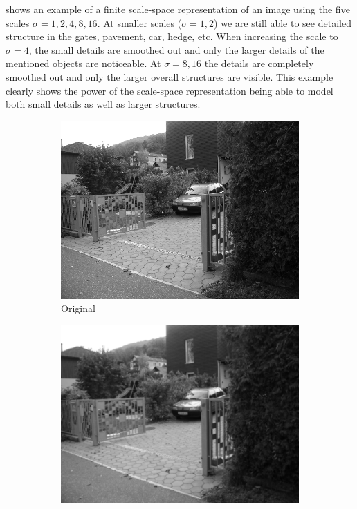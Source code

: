\documentclass[thesis.tex]{subfiles}
\begin{document}
 shows an example of a finite scale-space representation of an image using the five scales $\sigma = 1,2,4,8,16$. At smaller scales ($\sigma = 1,2$) we are still able to see detailed structure in the gates, pavement, car, hedge, etc. When increasing the scale to $\sigma = 4$, the small details are smoothed out and only the larger details of the mentioned objects are noticeable. At $\sigma = 8, 16$ the details are completely smoothed out and only the larger overall structures are visible. This example clearly shows the power of the scale-space representation being able to model both small details as well as larger structures.
%
\begin{figure}[p]
	\centering
	\begin{subfigure}[t]{0.3\textwidth}
		\includegraphics[width=\textwidth]{img/scaleSpaceTheory_0.png}
		\caption{Original}
		\label{fig:scaleSpaceExample0}
	\end{subfigure}
	\begin{subfigure}[t]{0.3\textwidth}
		\includegraphics[width=\textwidth]{img/scaleSpaceTheory_1.png}

\end{subfigure}
\end{figure}
\end{document}
